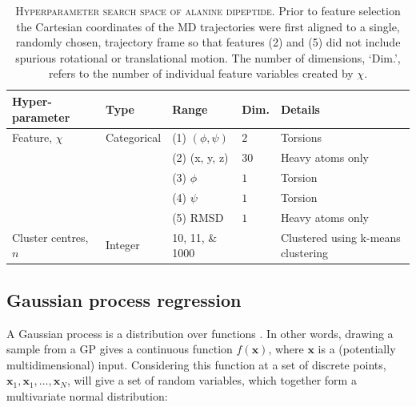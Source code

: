 \begin{table}
    \caption[Hyperparameter search space of alanine dipeptide]{\textsc{Hyperparameter search space of alanine dipeptide}. Prior to feature selection the Cartesian coordinates of the MD trajectories were first aligned to a single, randomly chosen, trajectory frame so that features (2) and (5) did not include spurious rotational or translational motion.  The number of dimensions, `Dim.', refers to the number of individual feature variables created by $\chi$.}
    \centering
    \begin{tabularx}{0.9\textwidth}{ >{\raggedright\arraybackslash}X lll >{\raggedright\arraybackslash}X } 
    \hline
    \textbf{Hyper-parameter} & \textbf{Type} & \textbf{Range} &\textbf{Dim.} & \textbf{Details} \\
     \hline\hline
    Feature, $\chi$ & Categorical & (1) $(\phi, \psi)$ & $2$ & Torsions \\
    & & (2) (x, y, z) & $30$ & Heavy atoms only  \\
    & & (3) $\phi$ & $1$ & Torsion \\ 
    & & (4) $\psi$ & $1$ & Torsion \\ 
    & & (5) RMSD & $1$ & Heavy atoms only\\ 
    \hline 
    Cluster centres, $n$ & Integer & \numlist[list-final-separator = { ... }]{10;11;1000} & & Clustered using k-means clustering \\
     \hline
    \end{tabularx}
    \label{tab:ala2searchspace}
\end{table}

\subsection{Gaussian process regression}\label{subsec:gp}

A Gaussian process is a distribution over functions \cite{rasmussenGaussianProcessesMachine2006}.  In other words, drawing a sample from a GP gives a continuous function $f(\mathbf{x})$, where $\mathbf{x}$ is a (potentially multidimensional) input. Considering this function at a set of discrete points, $\mathbf{x}_{1}, \mathbf{x}_{1},\ldots, \mathbf{x}_{N}$, will give a set of random variables, which together form a multivariate normal distribution: 

